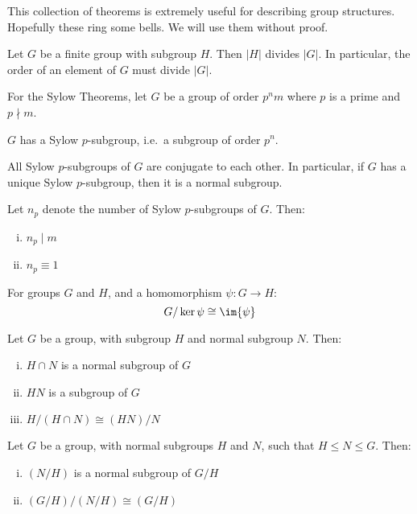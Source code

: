 This collection of theorems is extremely useful for describing group structures.
Hopefully these ring some bells.
We will use them without proof.

\begin{theorem}
    Let \(G\) be a finite group with subgroup \(H\).
    Then \(|H|\) divides \(|G|\).
    In particular, the order of an element of \(G\) must divide \(|G|\).
\end{theorem}

For the Sylow Theorems, let \(G\) be a group of order \(p^n m\) where \(p\) is a prime and \(p\nmid m\).
\begin{theorem}\label{thm:sylow1}
    \(G\) has a Sylow \(p\)-subgroup, i.e.\ a subgroup of order \(p^n\).
\end{theorem}
\begin{theorem}\label{thm:sylow2}
    All Sylow \(p\)-subgroups of \(G\) are conjugate to each other.
    In particular, if \(G\) has a unique Sylow \(p\)-subgroup, then it is a normal subgroup.
\end{theorem}
\begin{theorem}\label{thm:sylow3}
    Let \(n_p\) denote the number of Sylow \(p\)-subgroups of \(G\).
    Then:
    \begin{enumerate}[(i)]
        \item \(n_p \mid m\)
        \item \(n_p\equiv 1\) \)
    \end{enumerate}
\end{theorem}

\begin{theorem}\label{thm:iso1}
    For groups \(G\) and \(H\), and a homomorphism \(\psi:G \to H\):
    \[G / \ker{\psi} \cong \im{\psi}\]
\end{theorem}

\begin{theorem}\label{thm:iso2}
    Let \(G\) be a group, with subgroup \(H\) and normal subgroup \(N\).
    Then:
    \begin{enumerate}[(i)]
        \item \(H \cap N\) is a normal subgroup of \(G\)
        \item \(HN\) is a subgroup of \(G\) 
        \item \(H / (H \cap N) \cong (HN) / N\)
    \end{enumerate}
\end{theorem}

\begin{theorem}\label{thm:iso3}
    Let \(G\) be a group, with normal subgroups \(H\) and \(N\), such that \(H \leqslant N \leqslant G\).
    Then:
    \begin{enumerate}[(i)]
        \item \((N / H)\) is a normal subgroup of \(G / H\)
        \item \((G / H) / (N / H) \cong (G / H)\)
    \end{enumerate}
\end{theorem}
